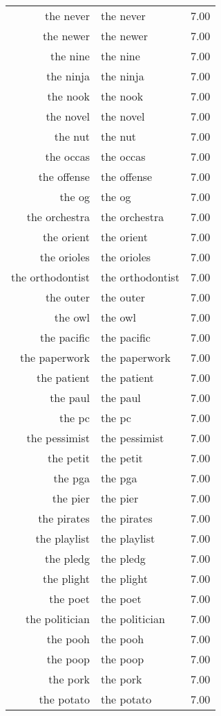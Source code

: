 \begin{table}[ht]
\begin{tabular}{rlr}
  the never & the never & 7.00 \\ 
  the newer & the newer & 7.00 \\ 
  the nine & the nine & 7.00 \\ 
  the ninja & the ninja & 7.00 \\ 
  the nook & the nook & 7.00 \\ 
  the novel & the novel & 7.00 \\ 
  the nut & the nut & 7.00 \\ 
  the occas & the occas & 7.00 \\ 
  the offense & the offense & 7.00 \\ 
  the og & the og & 7.00 \\ 
  the orchestra & the orchestra & 7.00 \\ 
  the orient & the orient & 7.00 \\ 
  the orioles & the orioles & 7.00 \\ 
  the orthodontist & the orthodontist & 7.00 \\ 
  the outer & the outer & 7.00 \\ 
  the owl & the owl & 7.00 \\ 
  the pacific & the pacific & 7.00 \\ 
  the paperwork & the paperwork & 7.00 \\ 
  the patient & the patient & 7.00 \\ 
  the paul & the paul & 7.00 \\ 
  the pc & the pc & 7.00 \\ 
  the pessimist & the pessimist & 7.00 \\ 
  the petit & the petit & 7.00 \\ 
  the pga & the pga & 7.00 \\ 
  the pier & the pier & 7.00 \\ 
  the pirates & the pirates & 7.00 \\ 
  the playlist & the playlist & 7.00 \\ 
  the pledg & the pledg & 7.00 \\ 
  the plight & the plight & 7.00 \\ 
  the poet & the poet & 7.00 \\ 
  the politician & the politician & 7.00 \\ 
  the pooh & the pooh & 7.00 \\ 
  the poop & the poop & 7.00 \\ 
  the pork & the pork & 7.00 \\ 
  the potato & the potato & 7.00 \\ 

\end{tabular}
\end{table}
